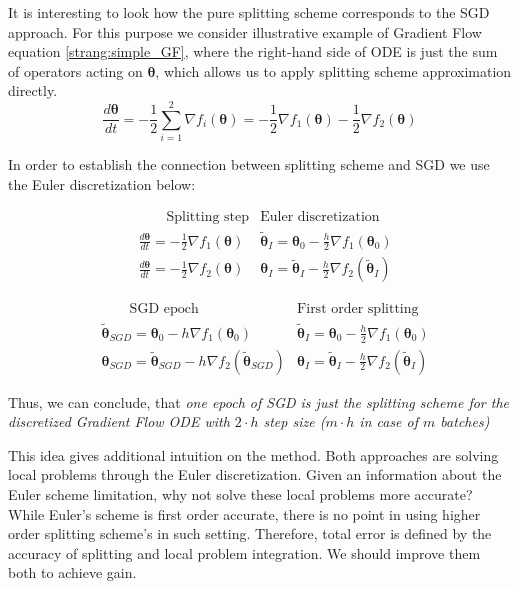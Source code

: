 \documentclass{article}
\newcommand{\vect}[1]{\boldsymbol{\mathbf{#1}}}
\begin{document}
It is interesting to look how the pure splitting scheme corresponds to the SGD approach. For this purpose we consider illustrative example of Gradient Flow equation \ref{strang:simple_GF}, where the right-hand side of ODE is just the sum of operators acting on $\vect{\theta}$, which allows us to apply splitting scheme approximation directly.
\begin{equation}
\label{strang:simple_GF}
\frac{d \vect{\theta}}{d t} = -\frac{1}{2} \sum\limits_{i=1}^2 \nabla f_i (\vect{\theta}) = - \frac{1}{2} \nabla f_1 (\vect{\theta}) -\frac{1}{2}  \nabla f_2 (\vect{\theta})
\end{equation}

In order to establish the connection between splitting scheme and SGD we use the Euler discretization below:

\begin{align*}
&\qquad\text{Splitting step} &\text{Euler discretization} \\
&\frac{d \vect{\theta}}{d t} = -\frac{1}{2}\nabla f_1(\vect{\theta}) &\tilde{\vect{\theta}}_{I} = \vect{\theta}_0 - \frac{h}{2}\nabla f_1 (\vect{\theta}_0) \\
&\frac{d \vect{\theta}}{d t} = -\frac{1}{2}\nabla f_2(\vect{\theta}) &\vect{\theta}_{I} = \tilde{\vect{\theta}}_{I} - \frac{h}{2}\nabla f_2 (\tilde{\vect{\theta}}_{I})
\end{align*}


\begin{align*}
&\qquad\text{SGD epoch} &\text{First order splitting} \\
&\tilde{\vect{\theta}}_{SGD} = \vect{\theta}_0 - h \nabla f_1 (\vect{\theta}_0) &\tilde{\vect{\theta}}_{I} = \vect{\theta}_0 - \frac{h}{2}\nabla f_1 (\vect{\theta}_0) \\
&\vect{\theta}_{SGD} = \tilde{\vect{\theta}}_{SGD} - h \nabla f_2 (\tilde{\vect{\theta}}_{SGD}) &\vect{\theta}_{I} = \tilde{\vect{\theta}}_{I} - \frac{h}{2}\nabla f_2 (\tilde{\vect{\theta}}_{I})
\end{align*}

Thus, we can conclude, that \textit{one epoch of SGD is just the splitting scheme for the discretized Gradient Flow ODE with $2 \cdot h$ step size ($m \cdot h$ in case of $m$ batches)}

This idea gives additional intuition on the method. Both approaches are solving local problems through the Euler discretization. Given an information about the Euler scheme limitation, why not solve these local problems more accurate? While Euler's scheme is first order accurate, there is no point in using higher order splitting scheme's in such setting. Therefore, total error is defined by the accuracy of splitting and local problem integration. We should improve them both to achieve gain.
\end{document}

